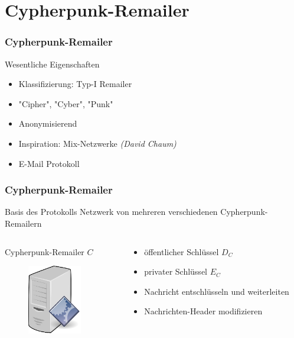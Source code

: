 \documentclass{beamer}
\begin{document}
\section{Cypherpunk-Remailer}
\begin{frame}
	\frametitle{Cypherpunk-Remailer}
	\begin{block}{Wesentliche Eigenschaften}
		\begin{itemize}
			\item Klassifizierung: Typ-I Remailer
			\pause
			\item "Cipher", "Cyber", "Punk"
			\pause
			\item Anonymisierend
			\pause
			\item Inspiration: Mix-Netzwerke \textit{(David Chaum)}
			\pause
			\item E-Mail Protokoll
		\end{itemize}
	\end{block}
\end{frame}

\begin{frame}
	\frametitle{Cypherpunk-Remailer}
	\begin{block}{Basis des Protokolls}
		Netzwerk von mehreren verschiedenen Cypherpunk-Remailern
	\end{block}
	\begin{columns}[T]
		\begin{column}[T]{5cm}
			\begin{center}
			Cypherpunk-Remailer \(C\) \\   

			\begin{figure}
			\includegraphics[height=3cm]{bilder/remailer.eps}
			\end{figure}
			\end{center}
		\end{column}
		\begin{column}[T]{5cm}
			\begin{center}	
			\begin{itemize}
				\item öffentlicher Schlüssel \(D_{C}\)
				\item privater Schlüssel \(E_{C}\)
				\item Nachricht entschlüsseln und weiterleiten
				\item Nachrichten-Header modifizieren
			\end{itemize}	
			\end{center}
		\end{column}
	\end{columns}
\end{frame}
\end{document}
